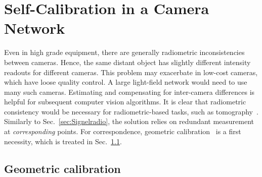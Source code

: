 \documentclass[runningheads]{llncs}
\begin{document}
\section{Self-Calibration in a Camera Network}
\label{sec:muticalib}

Even in high grade equipment, there are generally radiometric inconsistencies between cameras. Hence, the same distant object has slightly different intensity readouts for different cameras. This problem may exacerbate in low-cost cameras, which have loose quality control. A large light-field network would need to use many such cameras. Estimating and compensating for inter-camera differences is helpful for subsequent computer vision algorithms. It is clear that radiometric consistency would be necessary for radiometric-based tasks, such as tomography~\cite{Aides:13}.
 Similarly to Sec.~\ref{sec:Signelradio}, the solution relies on redundant measurement at {\em corresponding} points.   For correspondence, geometric calibration~\cite{Seiz2002} is a first necessity, which is treated in Sec.~\ref{sec:geometry}.


\subsection{Geometric calibration}
\label{sec:geometry}
\end{document}
